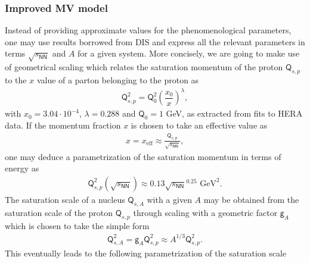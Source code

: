 \subsubsection*{Improved MV model}
Instead of providing approximate values for the phenomenological parameters, one may use results borrowed from {\sffamily DIS} and express all the relevant parameters in terms $\sqrt{s_{\textsf{NN}}}$ and $A$ for a given system. More concisely, we are going to make use of {\sffamily\color{ming}geometrical scaling} which relates the saturation momentum of the proton $\textsf{Q}_{s,p}$ to the $x$ value of a parton belonging to the proton as
\begin{align*}
    \textsf{Q}_{s,p}^2=\textsf{Q}_0^2\left(\dfrac{x_0}{x}\right)^\lambda,
\end{align*}
with $x_0=3.04\cdot 10^{-4}$, $\lambda=0.288$ and $\textsf{Q}_0=1$ GeV, as extracted from fits to {\sffamily HERA} data\cite{gbw}. If the momentum fraction $x$ is chosen to take an effective value as
\begin{align*}
    x=x_\text{eff}\approx \frac{\textsf{Q}_{s,p}}{\sqrt{s_{\textsf{NN}}}},
\end{align*}
one may deduce a parametrization of the saturation momentum in terms of energy as
\begin{align*}
    \textsf{Q}_{s, p}^{2}(\sqrt{s_{\textsf{NN}}}) \approx 0.13 \sqrt{s_{\textsf{NN}}} ^{0.25} \text{ GeV}^{2}.
\end{align*}
The saturation scale of a nucleus $\textsf{Q}_{s,A}$ with a given $A$ may be obtained from the saturation scale of the proton $\textsf{Q}_{s,p}$ through scaling with a geometric factor $\textsf{g}_A$ which is chosen to take the simple form
\begin{align*}
    \textsf{Q}_{s,A}^2=\textsf{g}_A\textsf{Q}_{s,p}^2\approx A^{1/3}\textsf{Q}_{s,p}^2.
\end{align*}
This eventually leads to the following parametrization of the saturation scale
